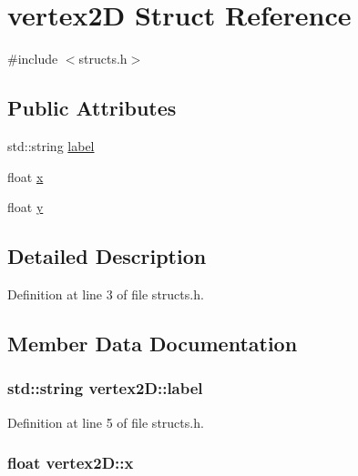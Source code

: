 \hypertarget{structvertex2_d}{}\section{vertex2D Struct Reference}
\label{structvertex2_d}


{\ttfamily \#include $<$structs.\+h$>$}

\subsection*{Public Attributes}
\begin{DoxyCompactItemize}
\item 
std\+::string \hyperlink{structvertex2_d_a92a0d499a4a4de12f7ea36423eb550b8}{label}
\item 
float \hyperlink{structvertex2_d_a2ba74d18c3e8e5a36fd2846a7a4d1a4f}{x}
\item 
float \hyperlink{structvertex2_d_a6ca32b6427f8d3ce3437db0bafd92a00}{y}
\end{DoxyCompactItemize}


\subsection{Detailed Description}


Definition at line 3 of file structs.\+h.



\subsection{Member Data Documentation}
\subsubsection[{\texorpdfstring{label}{label}}]{\setlength{\rightskip}{0pt plus 5cm}std\+::string vertex2\+D\+::label}\hypertarget{structvertex2_d_a92a0d499a4a4de12f7ea36423eb550b8}{}\label{structvertex2_d_a92a0d499a4a4de12f7ea36423eb550b8}


Definition at line 5 of file structs.\+h.

\subsubsection[{\texorpdfstring{x}{x}}]{\setlength{\rightskip}{0pt plus 5cm}float vertex2\+D\+::x}\hypertarget{structvertex2_d_a2ba74d18c3e8e5a36fd2846a7a4d1a4f}{}\label{structvertex2_d_a2ba74d18c3e8e5a36fd2846a7a4d1a4f}


